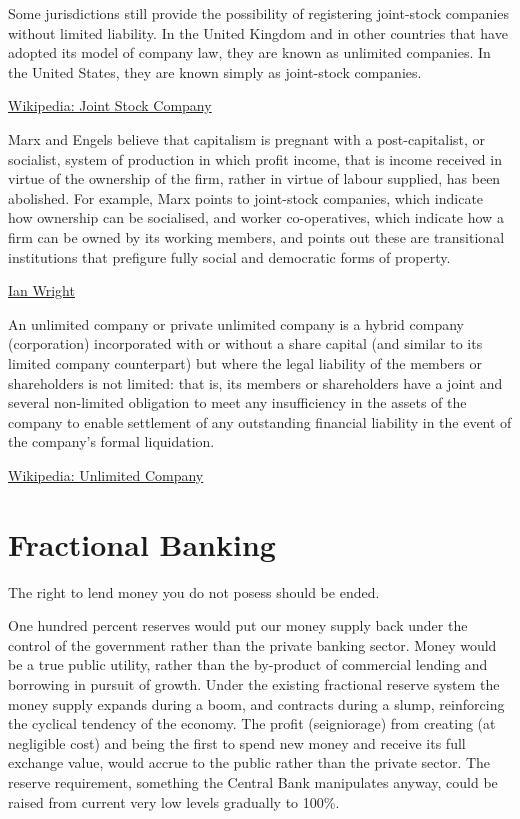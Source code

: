 \documentclass[
]{book}
\begin{document}
Some jurisdictions still provide the possibility of registering joint-stock companies without limited liability. In the United Kingdom and in other countries that have adopted its model of company law, they are known as unlimited companies. In the United States, they are known simply as joint-stock companies.

\href{https://en.wikipedia.org/wiki/Joint-stock_company}{Wikipedia: Joint Stock Company}

Marx and Engels believe that capitalism is pregnant with a post-capitalist, or socialist, system of production in which profit income, that is income received in virtue of the ownership of the firm, rather in virtue of labour supplied, has been abolished. For example, Marx points to joint-stock companies, which indicate how ownership can be socialised, and worker co-operatives, which indicate how a firm can be owned by its working members, and points out these are transitional institutions that prefigure fully social and democratic forms of property.

\href{https://ianwrightsite.wordpress.com/2021/03/05/marxs-irrational-irrational-commodity/}{Ian Wright}

An unlimited company or private unlimited company is a hybrid company (corporation) incorporated with or without a share capital (and similar to its limited company counterpart) but where the legal liability of the members or shareholders is not limited: that is, its members or shareholders have a joint and several non-limited obligation to meet any insufficiency in the assets of the company to enable settlement of any outstanding financial liability in the event of the company's formal liquidation.

\href{https://en.wikipedia.org/wiki/Unlimited_company}{Wikipedia: Unlimited Company}

\hypertarget{fractional-banking}{%
\section{Fractional Banking}\label{fractional-banking}}

The right to lend money you do not posess should be ended.

One hundred percent reserves would put our money supply back under the control of the government rather than the
private banking sector. Money would be a true public utility, rather than the by-product of commercial lending and
borrowing in pursuit of growth. Under the existing fractional reserve system the money supply expands during a
boom, and contracts during a slump, reinforcing the cyclical tendency of the economy. The profit (seigniorage) from
creating (at negligible cost) and being the first to spend new money and receive its full exchange value, would accrue
to the public rather than the private sector. The reserve requirement, something the Central Bank manipulates anyway,
could be raised from current very low levels gradually to 100\%.
\end{document}
